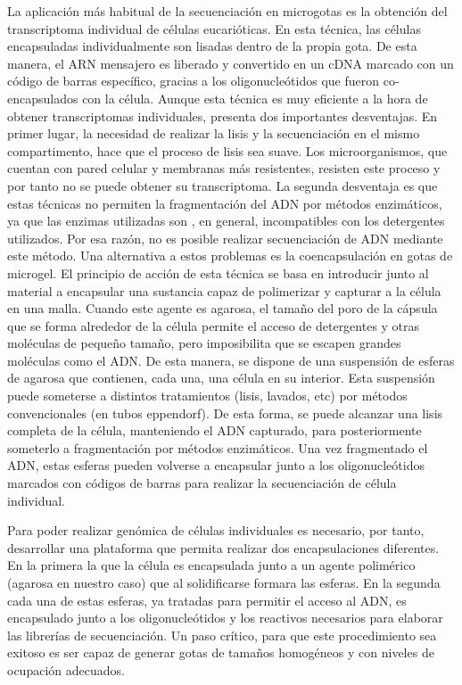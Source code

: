 La aplicación más habitual de la secuenciación en microgotas es la obtención del transcriptoma individual de células eucarióticas. En esta técnica, las células encapsuladas individualmente son lisadas dentro de la propia gota. De esta manera, el ARN mensajero es liberado y convertido  en un cDNA marcado con un código de barras específico, gracias a los oligonucleótidos que fueron co-encapsulados con la célula. Aunque esta técnica es muy eficiente a la hora de obtener transcriptomas individuales, presenta dos importantes desventajas. En primer lugar, la necesidad de realizar la lisis y la secuenciación en el mismo compartimento, hace que el proceso de lisis sea suave. Los microorganismos, que cuentan con pared celular y membranas más resistentes, resisten este proceso y por tanto no se puede obtener su transcriptoma. La segunda desventaja es que estas técnicas no permiten la fragmentación del ADN por métodos enzimáticos, ya que las enzimas utilizadas son , en general, incompatibles con los detergentes utilizados. Por esa razón, no es posible realizar secuenciación de ADN mediante este método. Una alternativa a estos problemas es la coencapsulación en gotas de microgel. El principio de acción de esta técnica se basa en introducir junto al material a encapsular una sustancia capaz de polimerizar y capturar a la célula en una malla. Cuando este agente es agarosa, el tamaño del poro de la cápsula que se forma alrededor de la célula permite el acceso de detergentes y otras moléculas de pequeño tamaño, pero imposibilita que se escapen grandes moléculas como el ADN. De esta manera, se dispone de una suspensión de esferas de agarosa que contienen, cada una, una célula en su interior. Esta suspensión puede someterse a distintos tratamientos (lisis, lavados, etc) por métodos convencionales (en tubos eppendorf). De esta forma, se puede alcanzar una lisis completa de la célula, manteniendo el ADN capturado, para posteriormente someterlo a fragmentación por métodos enzimáticos. Una vez fragmentado el ADN, estas esferas pueden volverse a encapsular junto a los oligonucleótidos marcados con códigos de barras para realizar la secuenciación de  célula individual.  

Para poder realizar genómica de células individuales es necesario, por tanto, desarrollar una plataforma que permita realizar dos encapsulaciones diferentes. En la primera la que la célula es encapsulada junto a un agente polimérico (agarosa en nuestro caso) que al solidificarse formara las esferas. En la segunda cada una de estas esferas, ya tratadas para permitir el acceso al ADN, es encapsulado junto a los oligonucleótidos y los reactivos necesarios para elaborar las librerías de secuenciación.  Un paso crítico, para que este procedimiento sea exitoso es ser capaz de generar gotas de tamaños homogéneos y con niveles de ocupación adecuados.  



